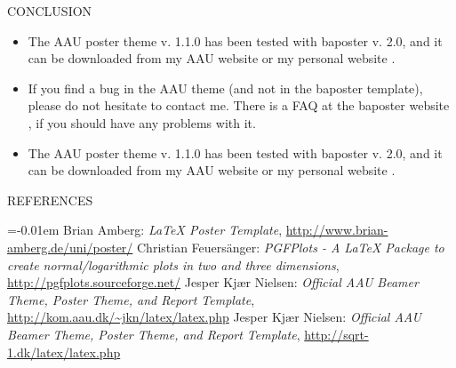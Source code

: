 \documentclass[a0paper,portrait]{baposter}
\begin{document}
\begin{poster}
\begin{posterbox}[name=feedback,column=1,below=figures]{CONCLUSION}
  \begin{itemize}
    \item The AAU poster theme v. 1.1.0 has been tested with baposter v. 2.0, and it can be downloaded from my AAU website \cite{jknaau} or my personal website \cite{jknsqrt-1}.
    \item If you find a bug in the AAU theme (and not in the baposter template), please do not hesitate to contact me. There is a FAQ at the baposter website \cite{baposter}, if you should have any problems with it.
    \item The AAU poster theme v. 1.1.0 has been tested with baposter v. 2.0, and it can be downloaded from my AAU website \cite{jknaau} or my personal website \cite{jknsqrt-1}.
  \end{itemize}
\end{posterbox}

\begin{posterbox}[name=refs,span=2,column=0,below=install,above=bottom]{REFERENCES}


\begin{thebibliography}{1}%
\itemsep=-0.01em%
\setlength{\baselineskip}{0.4em}%
 Brian Amberg: \emph{LaTeX Poster Template}, \url{http://www.brian-amberg.de/uni/poster/} 
 Christian Feuersänger: \emph{PGFPlots - A LaTeX Package to create normal/logarithmic plots in two and three dimensions}, \url{http://pgfplots.sourceforge.net/} 
 Jesper Kjær Nielsen: \emph{Official AAU Beamer Theme, Poster Theme, and Report Template}, \url{http://kom.aau.dk/~jkn/latex/latex.php}
 Jesper Kjær Nielsen: \emph{Official AAU Beamer Theme, Poster Theme, and Report Template}, \url{http://sqrt-1.dk/latex/latex.php}
\end{thebibliography}

%  
%   
\end{posterbox}

\end{poster}
\end{document}
